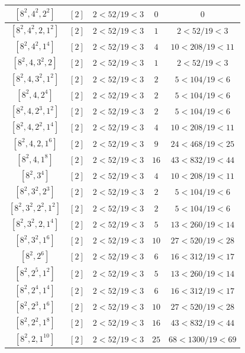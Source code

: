 \documentclass{article}%
\begin{document}
\begin{center}
\begin{longtable}{||c|c|c|c|c||}
$[8^{2}, 4^{2}, 2^{2}]$ & $[2]$ & $2 < 52/19 < 3$ & $0$ & $0$ \\ \hline 
$[8^{2}, 4^{2}, 2, 1^{2}]$ & $[2]$ & $2 < 52/19 < 3$ & $1$ & $2 < 52/19 < 3$ \\ \hline 
$[8^{2}, 4^{2}, 1^{4}]$ & $[2]$ & $2 < 52/19 < 3$ & $4$ & $10 < 208/19 < 11$ \\ \hline 
$[8^{2}, 4, 3^{2}, 2]$ & $[2]$ & $2 < 52/19 < 3$ & $1$ & $2 < 52/19 < 3$ \\ \hline 
$[8^{2}, 4, 3^{2}, 1^{2}]$ & $[2]$ & $2 < 52/19 < 3$ & $2$ & $5 < 104/19 < 6$ \\ \hline 
$[8^{2}, 4, 2^{4}]$ & $[2]$ & $2 < 52/19 < 3$ & $2$ & $5 < 104/19 < 6$ \\ \hline 
$[8^{2}, 4, 2^{3}, 1^{2}]$ & $[2]$ & $2 < 52/19 < 3$ & $2$ & $5 < 104/19 < 6$ \\ \hline 
$[8^{2}, 4, 2^{2}, 1^{4}]$ & $[2]$ & $2 < 52/19 < 3$ & $4$ & $10 < 208/19 < 11$ \\ \hline 
$[8^{2}, 4, 2, 1^{6}]$ & $[2]$ & $2 < 52/19 < 3$ & $9$ & $24 < 468/19 < 25$ \\ \hline 
$[8^{2}, 4, 1^{8}]$ & $[2]$ & $2 < 52/19 < 3$ & $16$ & $43 < 832/19 < 44$ \\ \hline 
$[8^{2}, 3^{4}]$ & $[2]$ & $2 < 52/19 < 3$ & $4$ & $10 < 208/19 < 11$ \\ \hline 
$[8^{2}, 3^{2}, 2^{3}]$ & $[2]$ & $2 < 52/19 < 3$ & $2$ & $5 < 104/19 < 6$ \\ \hline 
$[8^{2}, 3^{2}, 2^{2}, 1^{2}]$ & $[2]$ & $2 < 52/19 < 3$ & $2$ & $5 < 104/19 < 6$ \\ \hline 
$[8^{2}, 3^{2}, 2, 1^{4}]$ & $[2]$ & $2 < 52/19 < 3$ & $5$ & $13 < 260/19 < 14$ \\ \hline 
$[8^{2}, 3^{2}, 1^{6}]$ & $[2]$ & $2 < 52/19 < 3$ & $10$ & $27 < 520/19 < 28$ \\ \hline 
$[8^{2}, 2^{6}]$ & $[2]$ & $2 < 52/19 < 3$ & $6$ & $16 < 312/19 < 17$ \\ \hline 
$[8^{2}, 2^{5}, 1^{2}]$ & $[2]$ & $2 < 52/19 < 3$ & $5$ & $13 < 260/19 < 14$ \\ \hline 
$[8^{2}, 2^{4}, 1^{4}]$ & $[2]$ & $2 < 52/19 < 3$ & $6$ & $16 < 312/19 < 17$ \\ \hline 
$[8^{2}, 2^{3}, 1^{6}]$ & $[2]$ & $2 < 52/19 < 3$ & $10$ & $27 < 520/19 < 28$ \\ \hline 
$[8^{2}, 2^{2}, 1^{8}]$ & $[2]$ & $2 < 52/19 < 3$ & $16$ & $43 < 832/19 < 44$ \\ \hline 
$[8^{2}, 2, 1^{10}]$ & $[2]$ & $2 < 52/19 < 3$ & $25$ & $68 < 1300/19 < 69$ \\ \hline 

\end{longtable}
\end{center}
\end{document}
